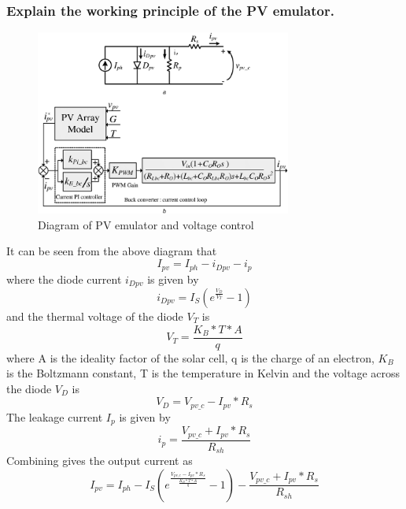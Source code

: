 \documentclass[]{article}
\begin{document}
 			\subsubsection{Explain the working principle of the PV emulator.}
				\begin{figure}[H]
					\centering
					\includegraphics*[width=0.75\textwidth]{Prework_images/PVDiagram}
					\caption{Diagram of PV emulator and voltage control}
				\end{figure}
				It can be seen from the above diagram that
				\begin{equation}\label{eq:TotalCurrent}
					I_{pv} = I_{ph} - i_{Dpv} - i_p
				\end{equation}
				where the diode current $i_{Dpv}$ is given by
				\begin{equation}\label{eq:DiodeCurrent}
					i_{Dpv} = I_S (e^{\frac{V_D}{V_T}} - 1)
				\end{equation}
				and the thermal voltage of the diode $V_T$ is 
				\begin{equation}\label{eq:ThermalVoltage}
					V_T=\frac{K_B*T*A}{q}
				\end{equation}
				where A is the ideality factor of the solar cell, q is the charge of an electron, $K_B$ is the Boltzmann constant, T is the temperature in Kelvin and the voltage across the diode $V_D$ is
				\begin{equation}\label{eq:DiodeVoltage}
					V_D=V_{pv\_c}-I_{pv}*R_s
				\end{equation}
				The leakage current $I_p$ is given by
				\begin{equation}\label{eq:LeakageCurrent}
					i_p=\frac{V_{pv\_c}+I_{pv}*R_s}{R_{sh}}
				\end{equation}
				Combining  gives the output current as
				\begin{equation}
					I_{pv}=I_{ph}-I_S(e^\frac{V_{pv\_c}-I_{pv}*R_s}{\frac{K_B*T*A}{q}}-1)-\frac{V_{pv\_c}+I_{pv}*R_s}{R_{sh}}
				\end{equation}
\end{document}
